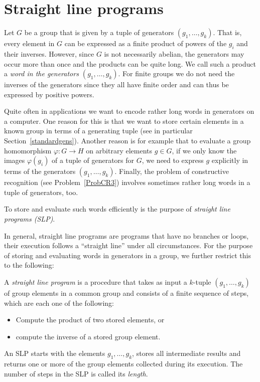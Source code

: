 \section{Straight line programs}
\label{slp}

%
Let $G$ be a group that is given by a tuple of generators $(g_1,
\ldots, g_k)$. That is, every element in $G$ can be expressed as a
finite product of powers of the $g_i$ and their inverses. However,
since $G$ is not necessarily abelian, the generators may occur more
than once and the products can be quite long. We call such a product a 
\emph{word in the generators $(g_1, \ldots, g_k)$}. 
%
For finite groups we do not need the
inverses of the generators since they all have finite order and can
thus be expressed by positive powers.

Quite often in applications we want to encode rather long words in
generators on a computer. One reason for this is that we want to store certain
elements in a known group in terms of a generating tuple (see in
particular Section~\ref{standardgens}). Another reason is for example that to
evaluate a group homomorphism $\varphi:G \to H$ on arbitrary elements
$g \in G$, if we only know the images $\varphi(g_i)$ of a tuple of
generators for $G$, we need to express $g$ explicitly in terms of
the generators $(g_1, \ldots, g_k)$. Finally, the problem of constructive
recognition (see Problem~\ref{ProbCR3}) involves sometimes rather
%
long words in a tuple of generators, too.

To store and evaluate such words efficiently is the purpose of
\emph{straight line programs (SLP)}.

In general, straight line programs are programs that have no branches
or loops, their execution follows a ``straight line'' under all
circumstances. For the purpose of storing and evaluating words in
generators in a group, we further restrict this to the following:

\begin{Def}
    \label{defslp}%
    A \emph{straight line program} is a procedure that takes as input a
    $k$-tuple $(g_1, \ldots, g_k)$ of group elements in a 
    common group and consists of a finite 
    sequence of steps, which are each one of the following:
\begin{itemize}
    \item Compute the product of two stored elements, or
    \item compute the inverse of a stored group element.
\end{itemize}
    An SLP starts with the elements $g_1, \ldots, g_k$,
    stores all intermediate results and returns one or more of the 
    group elements collected during its execution. The number of
    steps in the SLP is called its \emph{length}.
\end{Def}


